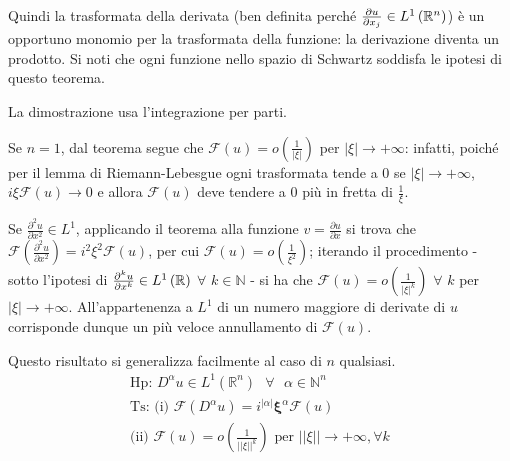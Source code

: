 \documentclass{article}
\begin{document}
Quindi la trasformata della derivata (ben definita perch\'{e} $\frac{%
\partial u}{\partial x_{j}}\in L^{1}\left( 
\mathbb{R}
^{n}\right) $) \`{e} un opportuno monomio per la trasformata della funzione:
la derivazione diventa un prodotto. Si noti che ogni funzione nello spazio
di Schwartz soddisfa le ipotesi di questo teorema.

La dimostrazione usa l'integrazione per parti.

Se $n=1$, dal teorema segue che $\mathcal{F}\left( u\right) =o\left( \frac{1%
}{\left\vert \xi \right\vert }\right) $ per $\left\vert \xi \right\vert
\rightarrow +\infty $: infatti, poich\'{e} per il lemma di Riemann-Lebesgue
ogni trasformata tende a $0$ se $\left\vert \xi \right\vert \rightarrow
+\infty $, $i\xi \mathcal{F}\left( u\right) \rightarrow 0$ e allora $%
\mathcal{F}\left( u\right) $ deve tendere a $0$ pi\`{u} in fretta di $\frac{1%
}{\xi }$.

Se $\frac{\partial ^{2}u}{\partial x^{2}}\in L^{1}$, applicando il teorema
alla funzione $v=\frac{\partial u}{\partial x}$ si trova che $\mathcal{F}%
\left( \frac{\partial ^{2}u}{\partial x^{2}}\right) =i^{2}\xi ^{2}\mathcal{F}%
\left( u\right) $, per cui $\mathcal{F}\left( u\right) =o\left( \frac{1}{\xi
^{2}}\right) $; iterando il procedimento - sotto l'ipotesi di $\frac{%
\partial ^{k}u}{\partial x^{k}}\in L^{1}\left( 
\mathbb{R}
\right) $ $\forall $ $k\in 
\mathbb{N}
$ - si ha che $\mathcal{F}\left( u\right) =o\left( \frac{1}{\left\vert \xi
\right\vert ^{k}}\right) $ $\forall $ $k$ per $\left\vert \xi \right\vert
\rightarrow +\infty $. All'appartenenza a $L^{1}$ di un numero maggiore di
derivate di $u$ corrisponde dunque un pi\`{u} veloce annullamento di $%
\mathcal{F}\left( u\right) $.

Questo risultato si generalizza facilmente al caso di $n$ qualsiasi.%
\begin{gather*}
\text{Hp: }D^{\alpha }u\in L^{1}\left( 
\mathbb{R}
^{n}\right) \text{ }\forall \text{ }\alpha \in 
\mathbb{N}
^{n} \\
\text{Ts: (i) }\mathcal{F}\left( D^{\alpha }u\right) =i^{\left\vert \alpha
\right\vert }\mathbf{\xi }^{\alpha }\mathcal{F}\left( u\right) \\
\text{(ii) }\mathcal{F}\left( u\right) =o\left( \frac{1}{\left\vert
\left\vert \xi \right\vert \right\vert ^{k}}\right) \text{ per }\left\vert
\left\vert \xi \right\vert \right\vert \rightarrow +\infty ,\forall k
\end{gather*}
\end{document}
